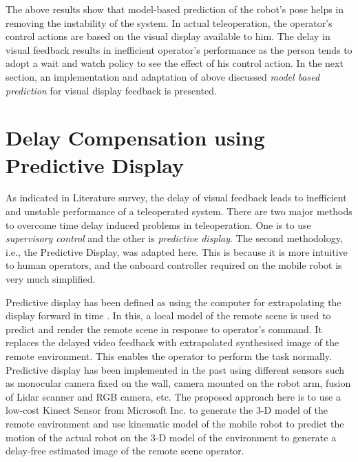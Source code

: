 The above results show that model-based prediction of the robot's pose helps in removing the instability of the system. In  actual teleoperation, the operator's control actions are based on the visual display available to him.  The delay in visual feedback results in inefficient operator's performance as the person tends to adopt a wait and watch policy to see the effect of his control action. In the next section,  an implementation and adaptation  of above discussed \textit{model based prediction }  for  visual display feedback is presented.   
  
\section{Delay Compensation using Predictive Display}
As indicated in  Literature survey,  the delay of visual feedback leads to inefficient and unstable performance of a teleoperated system. There are two major methods to overcome time delay induced problems in teleoperation. One is to use \textit{supervisory control} and the other is \textit{predictive display}. The second methodology, i.e., the Predictive Display, was adapted here. This is because it is more intuitive to human operators, and the onboard controller  required on the mobile robot is very much simplified.  

  
Predictive display has been defined as using the computer for extrapolating the display forward in time \cite{sheridan}. In this, a local model of the remote scene is used to predict and render the remote scene in response to operator's command. It replaces the delayed video feedback with extrapolated synthesised  image of the remote environment. This enables the operator to perform the task normally. Predictive display has been implemented in the past using different sensors such as monocular camera fixed on the wall, camera mounted on the robot arm, fusion of Lidar scanner and RGB camera, etc. 
The proposed approach here is to use a low-cost  Kinect Sensor from Microsoft Inc. to generate the 3-D model of the remote environment and use kinematic model of the mobile robot to predict the motion of the actual robot on the 3-D model of the environment  to generate a delay-free estimated image of the remote scene operator.

